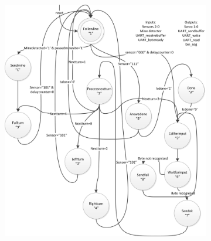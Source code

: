 \documentclass{report}
\begin{document}
\begin{figure}[H]
\begin{subfigure}{0.50\linewidth}
\includegraphics[width=\linewidth]{FSMMain}
\end{subfigure}
\quad
\begin{subfigure}{0.20\linewidth}
\label{fig:fsmSender}

\end{subfigure}
\end{figure}
\end{document}
